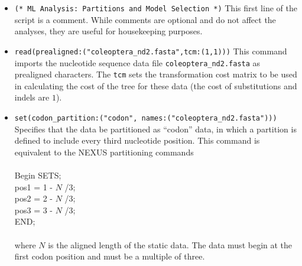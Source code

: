 \begin{itemize}
\item \texttt{(* ML Analysis: Partitions and Model Selection *)} 
This first line of the script is a comment. While comments are optional and do not affect the analyses, they are 
useful for housekeeping purposes.
\item \texttt{read(prealigned:("coleoptera\_nd2.fasta",tcm:(1,1)))} This command imports the nucleotide sequence 
data file \texttt{coleoptera\_nd2.fasta} as prealigned characters.  The \texttt{tcm} sets the transformation cost matrix 
to be used in calculating the cost of the tree for these data (the cost of substitutions and indels are $1$). 
\item \texttt{set(codon\_partition:("codon", names:("coleoptera\_nd2.fasta")))} Specifies that the data be 
partitioned as ``codon'' data, in which a partition is defined to include every third nucleotide position. 
This command is equivalent to the NEXUS partitioning commands
\\
\\
Begin SETS;\\
pos1 = 1 - $N$ /3;\\
pos2 = 2 - $N$ /3;\\
pos3 = 3 - $N$ /3;\\
END;\\
\\
where $N$ is the aligned length of the static data. The data must begin at the first codon position and must be a multiple
of three.



\end{itemize}
